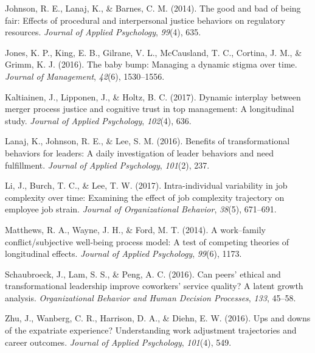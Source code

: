 \documentclass[english,,man]{apa6}
\theoremstyle{definition}
\theoremstyle{definition}
\theoremstyle{definition}
\theoremstyle{remark}
\begin{document}
\leavevmode\hypertarget{ref-johnson2014}{}%
Johnson, R. E., Lanaj, K., \& Barnes, C. M. (2014). The good and bad of
being fair: Effects of procedural and interpersonal justice behaviors on
regulatory resources. \emph{Journal of Applied Psychology},
\emph{99}(4), 635.

\leavevmode\hypertarget{ref-jones2016}{}%
Jones, K. P., King, E. B., Gilrane, V. L., McCausland, T. C., Cortina,
J. M., \& Grimm, K. J. (2016). The baby bump: Managing a dynamic stigma
over time. \emph{Journal of Management}, \emph{42}(6), 1530--1556.

\leavevmode\hypertarget{ref-kaltiainen2017}{}%
Kaltiainen, J., Lipponen, J., \& Holtz, B. C. (2017). Dynamic interplay
between merger process justice and cognitive trust in top management: A
longitudinal study. \emph{Journal of Applied Psychology}, \emph{102}(4),
636.

\leavevmode\hypertarget{ref-Lanaj2016}{}%
Lanaj, K., Johnson, R. E., \& Lee, S. M. (2016). Benefits of
transformational behaviors for leaders: A daily investigation of leader
behaviors and need fulfillment. \emph{Journal of Applied Psychology},
\emph{101}(2), 237.

\leavevmode\hypertarget{ref-li2017}{}%
Li, J., Burch, T. C., \& Lee, T. W. (2017). Intra-individual variability
in job complexity over time: Examining the effect of job complexity
trajectory on employee job strain. \emph{Journal of Organizational
Behavior}, \emph{38}(5), 671--691.

\leavevmode\hypertarget{ref-matthews2014}{}%
Matthews, R. A., Wayne, J. H., \& Ford, M. T. (2014). A work--family
conflict/subjective well-being process model: A test of competing
theories of longitudinal effects. \emph{Journal of Applied Psychology},
\emph{99}(6), 1173.

\leavevmode\hypertarget{ref-schaubroeck2016}{}%
Schaubroeck, J., Lam, S. S., \& Peng, A. C. (2016). Can peers' ethical
and transformational leadership improve coworkers' service quality? A
latent growth analysis. \emph{Organizational Behavior and Human Decision
Processes}, \emph{133}, 45--58.

\leavevmode\hypertarget{ref-zhu2016}{}%
Zhu, J., Wanberg, C. R., Harrison, D. A., \& Diehn, E. W. (2016). Ups
and downs of the expatriate experience? Understanding work adjustment
trajectories and career outcomes. \emph{Journal of Applied Psychology},
\emph{101}(4), 549.
\end{document}
